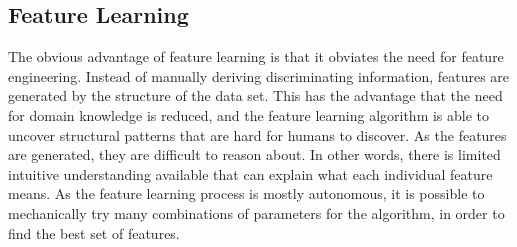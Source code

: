 \subsection{Feature Learning}
The obvious advantage of feature learning is that it obviates the need for feature engineering. Instead of manually deriving discriminating information, features are generated by the structure of the data set. This has the advantage that the need for domain knowledge is reduced, and the feature learning algorithm is able to uncover structural patterns that are hard for humans to discover. As the features are generated, they are difficult to reason about. In other words, there is limited intuitive understanding available that can explain what each individual feature means. As the feature learning process is mostly autonomous, it is possible to mechanically try many combinations of parameters for the algorithm, in order to find the best set of features.


